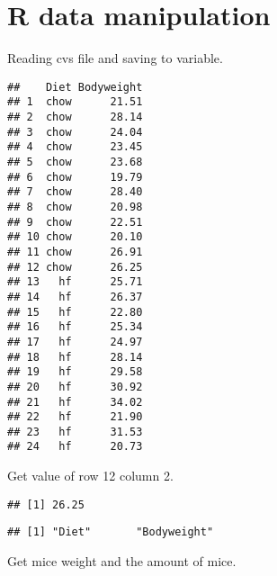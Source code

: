 \hypertarget{r-data-manipulation}{%
\section{R data manipulation}\label{r-data-manipulation}}

Reading cvs file and saving to variable.

\begin{Shaded}
\begin{Highlighting}[]
\StringTok{ }\NormalTok{(}\NormalTok{)}
\end{Highlighting}
\end{Shaded}

\begin{verbatim}
##    Diet Bodyweight
## 1  chow      21.51
## 2  chow      28.14
## 3  chow      24.04
## 4  chow      23.45
## 5  chow      23.68
## 6  chow      19.79
## 7  chow      28.40
## 8  chow      20.98
## 9  chow      22.51
## 10 chow      20.10
## 11 chow      26.91
## 12 chow      26.25
## 13   hf      25.71
## 14   hf      26.37
## 15   hf      22.80
## 16   hf      25.34
## 17   hf      24.97
## 18   hf      28.14
## 19   hf      29.58
## 20   hf      30.92
## 21   hf      34.02
## 22   hf      21.90
## 23   hf      31.53
## 24   hf      20.73
\end{verbatim}

Get value of row 12 column 2.

\begin{Shaded}
\begin{Highlighting}[]
\NormalTok{miceData[}\NormalTok{,}\NormalTok{]}
\end{Highlighting}
\end{Shaded}

\begin{verbatim}
## [1] 26.25
\end{verbatim}

\begin{Shaded}
\begin{Highlighting}[]
\end{Highlighting}
\end{Shaded}

\begin{verbatim}
## [1] "Diet"       "Bodyweight"
\end{verbatim}

Get mice weight and the amount of mice.

